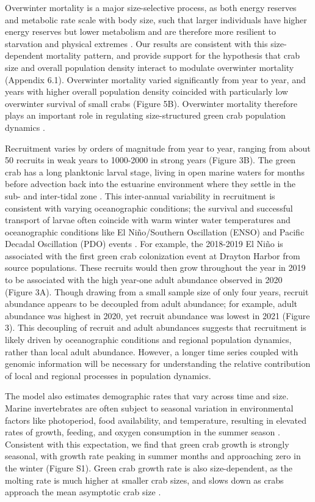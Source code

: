\documentclass{article}
\begin{document}
Overwinter mortality is a major size-selective process, as both energy reserves and metabolic rate scale with body size, such that larger individuals have higher energy reserves but lower metabolism and are therefore more resilient to starvation and physical extremes \parencite{carlson2008seasonal, sogard1997size}. Our results are consistent with this size-dependent mortality pattern, and provide support for the hypothesis that crab size and overall population density interact to modulate overwinter mortality (Appendix 6.1). Overwinter mortality varied significantly from year to year, and years with higher overall population density coincided with particularly low overwinter survival of small crabs (Figure 5B). Overwinter mortality therefore plays an important role in regulating size-structured green crab population dynamics \parencite{henderson1988size}. 

Recruitment varies by orders of magnitude from year to year, ranging from about 50 recruits in weak years to 1000-2000 in strong years (Figure 3B). The green crab has a long planktonic larval stage, living in open marine waters for months before advection back into the estuarine environment where they settle in the sub- and inter-tidal zone \parencite{yamada2001global}. This inter-annual variability in recruitment is consistent with varying oceanographic conditions; the survival and successful transport of larvae often coincide with warm winter water temperatures and oceanographic conditions like El Niño/Southern Oscillation (ENSO) and Pacific Decadal Oscillation (PDO) events \parencite{yamada2021ocean}. For example, the 2018-2019 El Niño is associated with the first green crab colonization event at Drayton Harbor from source populations. These recruits would then grow throughout the year in 2019 to be associated with the high year-one adult abundance observed in 2020 (Figure 3A). Though drawing from a small sample size of only four years, recruit abundance appears to be decoupled from adult abundance; for example, adult abundance was highest in 2020, yet recruit abundance was lowest in 2021 (Figure 3). This decoupling of recruit and adult abundances suggests that recruitment is likely driven by oceanographic conditions and regional population dynamics, rather than local adult abundance. However, a longer time series coupled with genomic information will be necessary for understanding the relative contribution of local and regional processes in population dynamics.

The model also estimates demographic rates that vary across time and size. Marine invertebrates are often subject to seasonal variation in environmental factors like photoperiod, food availability, and temperature, resulting in elevated rates of growth, feeding, and oxygen consumption in the summer season \parencite{brockington2001relative}. Consistent with this expectation, we find that green crab growth is strongly seasonal, with growth rate peaking in summer months and approaching zero in the winter (Figure S1). Green crab growth rate is also size-dependent, as the molting rate is much higher at smaller crab sizes, and slows down as crabs approach the mean asymptotic crab size \parencite{yamada2005growth}.
\end{document}
